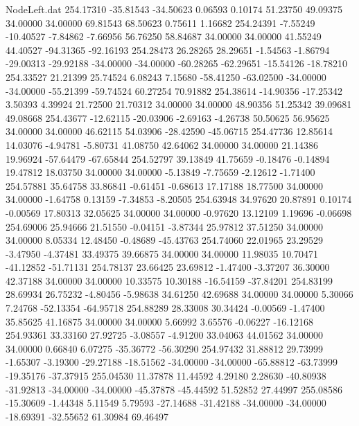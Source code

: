 \begin{filecontents}{NodeLeft.dat}
 254.17310  -35.81543  -34.50623     0.06593    0.10174   51.23750   49.09375   34.00000   34.00000   69.81543   68.50623    0.75611    1.16682
 254.24391   -7.55249  -10.40527    -7.84862   -7.66956   56.76250   58.84687   34.00000   34.00000   41.55249   44.40527  -94.31365  -92.16193
 254.28473   26.28265   28.29651    -1.54563   -1.86794  -29.00313  -29.92188  -34.00000  -34.00000  -60.28265  -62.29651  -15.54126  -18.78210
 254.33527   21.21399   25.74524     6.08243    7.15680  -58.41250  -63.02500  -34.00000  -34.00000  -55.21399  -59.74524   60.27254   70.91882
 254.38614  -14.90356  -17.25342     3.50393    4.39924   21.72500   21.70312   34.00000   34.00000   48.90356   51.25342   39.09681   49.08668
 254.43677  -12.62115  -20.03906    -2.69163   -4.26738   50.50625   56.95625   34.00000   34.00000   46.62115   54.03906  -28.42590  -45.06715
 254.47736   12.85614   14.03076    -4.94781   -5.80731   41.08750   42.64062   34.00000   34.00000   21.14386   19.96924  -57.64479  -67.65844
 254.52797   39.13849   41.75659    -0.18476   -0.14894   19.47812   18.03750   34.00000   34.00000   -5.13849   -7.75659   -2.12612   -1.71400
 254.57881   35.64758   33.86841    -0.61451   -0.68613   17.17188   18.77500   34.00000   34.00000   -1.64758    0.13159   -7.34853   -8.20505
 254.63948   34.97620   20.87891     0.10174   -0.00569   17.80313   32.05625   34.00000   34.00000   -0.97620   13.12109    1.19696   -0.06698
 254.69006   25.94666   21.51550    -0.04151   -3.87344   25.97812   37.51250   34.00000   34.00000    8.05334   12.48450   -0.48689  -45.43763
 254.74060   22.01965   23.29529    -3.47950   -4.37481   33.49375   39.66875   34.00000   34.00000   11.98035   10.70471  -41.12852  -51.71131
 254.78137   23.66425   23.69812    -1.47400   -3.37207   36.30000   42.37188   34.00000   34.00000   10.33575   10.30188  -16.54159  -37.84201
 254.83199   28.69934   26.75232    -4.80456   -5.98638   34.61250   42.69688   34.00000   34.00000    5.30066    7.24768  -52.13354  -64.95718
 254.88289   28.33008   30.34424    -0.00569   -1.47400   35.85625   41.16875   34.00000   34.00000    5.66992    3.65576   -0.06227  -16.12168
 254.93361   33.33160   27.92725    -3.08557   -4.91200   33.04063   44.01562   34.00000   34.00000    0.66840    6.07275  -35.36772  -56.30290
 254.97432   31.88812   29.73999    -1.65307   -3.19300  -29.27188  -18.51562  -34.00000  -34.00000  -65.88812  -63.73999  -19.35176  -37.37915
 255.04530   11.37878   11.44592     4.29180    2.28630  -40.80938  -31.92813  -34.00000  -34.00000  -45.37878  -45.44592   51.52852   27.44997
 255.08586  -15.30609   -1.44348     5.11549    5.79593  -27.14688  -31.42188  -34.00000  -34.00000  -18.69391  -32.55652   61.30984   69.46497

\end{filecontents}
